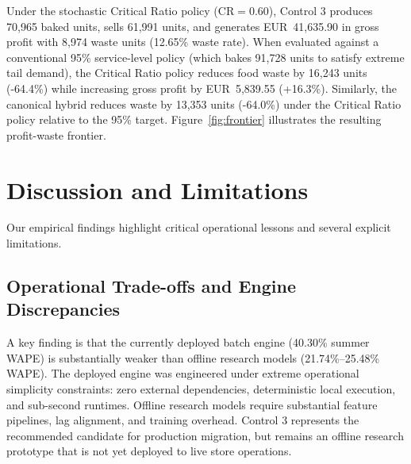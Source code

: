 \documentclass[conference]{IEEEtran}
\begin{document}
Under the stochastic Critical Ratio policy ($\text{CR}=0.60$), Control 3 produces 70,965 baked units, sells 61,991 units, and generates EUR~41,635.90 in gross profit with 8,974 waste units (12.65\% waste rate). When evaluated against a conventional 95\% service-level policy (which bakes 91,728 units to satisfy extreme tail demand), the Critical Ratio policy reduces food waste by 16,243 units (-64.4\%) while increasing gross profit by EUR~5,839.55 (+16.3\%). Similarly, the canonical hybrid reduces waste by 13,353 units (-64.0\%) under the Critical Ratio policy relative to the 95\% target. Figure~\ref{fig:frontier} illustrates the resulting profit-waste frontier.

\section{Discussion and Limitations}
Our empirical findings highlight critical operational lessons and several explicit limitations.

\subsection{Operational Trade-offs and Engine Discrepancies}
A key finding is that the currently deployed batch engine (40.30\% summer WAPE) is substantially weaker than offline research models (21.74\%--25.48\% WAPE). The deployed engine was engineered under extreme operational simplicity constraints: zero external dependencies, deterministic local execution, and sub-second runtimes. Offline research models require substantial feature pipelines, lag alignment, and training overhead. Control 3 represents the recommended candidate for production migration, but remains an offline research prototype that is not yet deployed to live store operations.
\end{document}
